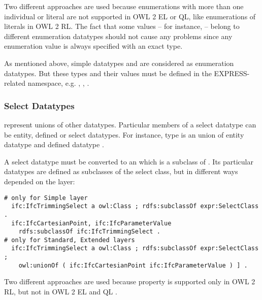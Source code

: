 Two different approaches are used because enumerations with more than one individual or literal are not supported in OWL 2 EL or QL, like enumerations of literals in OWL 2 RL. The fact that some values -- for instance,  -- belong to different enumeration data\-types should not cause any problems since any enumeration value is always specified with an exact type. 

As mentioned above, simple data\-types  and  are considered as enumeration data\-types. But these types and their values must be defined in the EXPRESS-related namespace, e.g. , , .



\subsubsection{Select Datatypes} represent unions of other data\-types. Particular members of a select data\-type can be entity, defined or select data\-types. For instance, type  is an union of entity data\-type  and defined data\-type .

\begin{principle}%
A select data\-type must be converted to an  which is a subclass of . Its particular data\-types are defined as subclasses of the select class, but in different ways depended on the layer:
\end{principle}

\begin{lstlisting}
# only for Simple layer
  ifc:IfcTrimmingSelect a owl:Class ; rdfs:subclassOf expr:SelectClass .
  ifc:IfcCartesianPoint, ifc:IfcParameterValue
    rdfs:subclassOf ifc:IfcTrimmingSelect .
# only for Standard, Extended layers
  ifc:IfcTrimmingSelect a owl:Class ; rdfs:subclassOf expr:SelectClass ;
    owl:unionOf ( ifc:IfcCartesianPoint ifc:IfcParameterValue ) ] .
\end{lstlisting}

Two different approaches are used because property  is supported only in OWL 2 RL, but not in OWL 2 EL and QL \cite{w3c:owl2-profiles}.



